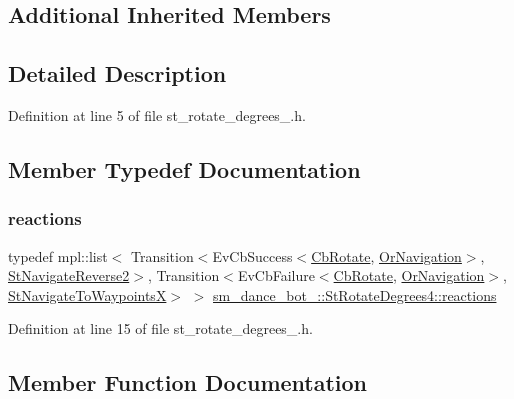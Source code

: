 \subsection*{Additional Inherited Members}


\subsection{Detailed Description}


Definition at line 5 of file st\+\_\+rotate\+\_\+degrees\+\_.\+h.



\subsection{Member Typedef Documentation}
\mbox{\label{structsm__dance__bot__2_1_1StRotateDegrees4_a4d99def8f8616fd8619c5cafb9f63842}} 
\subsubsection{\texorpdfstring{reactions}{reactions}}
{\footnotesize\ttfamily typedef mpl\+::list$<$ Transition$<$Ev\+Cb\+Success$<$\hyperlink{classcl__move__base__z_1_1CbRotate}{Cb\+Rotate}, \hyperlink{classsm__dance__bot__2_1_1OrNavigation}{Or\+Navigation}$>$, \hyperlink{structsm__dance__bot__2_1_1StNavigateReverse2}{St\+Navigate\+Reverse2}$>$, Transition$<$Ev\+Cb\+Failure$<$\hyperlink{classcl__move__base__z_1_1CbRotate}{Cb\+Rotate}, \hyperlink{classsm__dance__bot__2_1_1OrNavigation}{Or\+Navigation}$>$, \hyperlink{structsm__dance__bot__2_1_1StNavigateToWaypointsX}{St\+Navigate\+To\+WaypointsX}$>$ $>$ \hyperlink{structsm__dance__bot__2_1_1StRotateDegrees4_a4d99def8f8616fd8619c5cafb9f63842}{sm\+\_\+dance\+\_\+bot\+\_\+::\+St\+Rotate\+Degrees4\+::reactions}}



Definition at line 15 of file st\+\_\+rotate\+\_\+degrees\+\_.\+h.



\subsection{Member Function Documentation}
\mbox{\label{structsm__dance__bot__2_1_1StRotateDegrees4_a553d00b558b39dc3dfa5e670bd7ee30a}} 
